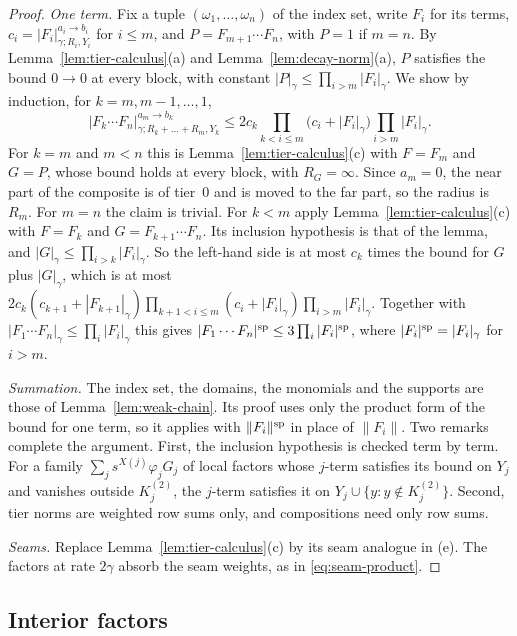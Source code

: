 \begin{proof}
\emph{One term.} Fix a tuple $(\omega_1,\dots,\omega_n)$ of the index set, write $F_i$ for its terms, $c_i=|F_i|^{a_i\to b_i}_{\gamma;R_i,Y_i}$ for $i\le m$, and $P=F_{m+1}\cdots F_n$, with $P=1$ if $m=n$. By Lemma~\ref{lem:tier-calculus}(a) and Lemma~\ref{lem:decay-norm}(a), $P$ satisfies the bound $0\to0$ at every block, with constant $|P|_\gamma\le\prod_{i>m}|F_i|_\gamma$. We show by induction, for $k=m,m-1,\dots,1$,
\[
|F_k\cdots F_n|^{a_m\to b_k}_{\gamma;R_k+\dots+R_m,Y_k}\le2c_k\prod_{k<i\le m}\big(c_i+|F_i|_\gamma\big)\prod_{i>m}|F_i|_\gamma .
\]
For $k=m$ and $m<n$ this is Lemma~\ref{lem:tier-calculus}(c) with $F=F_m$ and $G=P$, whose bound holds at every block, with $R_G=\infty$. Since $a_m=0$, the near part of the composite is of tier~$0$ and is moved to the far part, so the radius is $R_m$. For $m=n$ the claim is trivial. For $k<m$ apply Lemma~\ref{lem:tier-calculus}(c) with $F=F_k$ and $G=F_{k+1}\cdots F_n$. Its inclusion hypothesis is that of the lemma, and $|G|_\gamma\le\prod_{i>k}|F_i|_\gamma$. So the left-hand side is at most $c_k$ times the bound for $G$ plus $|G|_\gamma$, which is at most $2c_k(c_{k+1}+|F_{k+1}|_\gamma)\prod_{k+1<i\le m}(c_i+|F_i|_\gamma)\prod_{i>m}|F_i|_\gamma$. Together with $|F_1\cdots F_n|_\gamma\le\prod_i|F_i|_\gamma$ this gives $|F_1\cdots F_n|^{\rm sp}\le3\prod_i|F_i|^{\rm sp}$, where $|F_i|^{\rm sp}=|F_i|_\gamma$ for $i>m$.

\emph{Summation.} The index set, the domains, the monomials and the supports are those of Lemma~\ref{lem:weak-chain}. Its proof uses only the product form of the bound for one term, so it applies with $\|F_i\|^{\rm sp}$ in place of $\|F_i\|$. Two remarks complete the argument. First, the inclusion hypothesis is checked term by term. For a family $\sum_js^{X(j)}\varphi_jG_j$ of local factors whose $j$-term satisfies its bound on $Y_j$ and vanishes outside $K_j^{(2)}$, the $j$-term satisfies it on $Y_j\cup\{y:y\notin K_j^{(2)}\}$. Second, tier norms are weighted row sums only, and compositions need only row sums.

\emph{Seams.} Replace Lemma~\ref{lem:tier-calculus}(c) by its seam analogue in (e). The factors at rate $2\gamma$ absorb the seam weights, as in \eqref{eq:seam-product}.
\end{proof}

\subsection{Interior factors}\label{ss:44.2}

